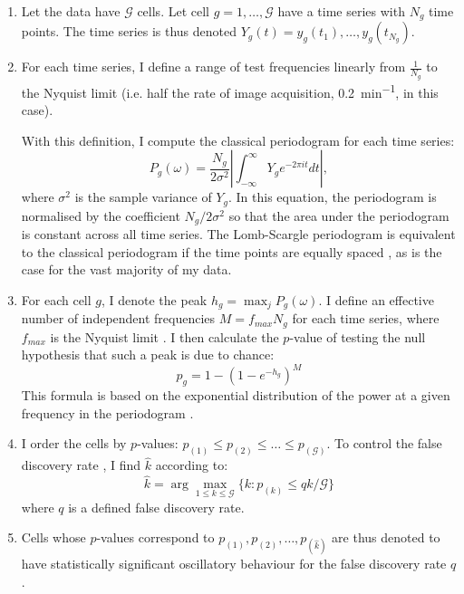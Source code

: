 \begin{enumerate}
\item Let the data have $\mathcal{G}$ cells.
Let cell $g = 1, \dots{}, \mathcal{G}$ have a time series with $N_{g}$ time points.
The time series is thus denoted $Y_{g}(t) = y_{g}(t_{1}), \dots{}, y_{g}(t_{N_{g}})$.
\item For each time series, I define a range of test frequencies linearly from $\frac{1}{N_{g}}$ to the Nyquist limit (i.e. half the rate of image acquisition, \SI{0.2}{\minute^{-1}}, in this case).

With this definition, I compute the classical periodogram for each time series:
  \begin{equation}
    P_{g}(\omega) = \frac{N_{g}}{2\sigma^{2}} \left|\int_{-\infty}^{\infty} Y_{g} e^{-2\pi it}dt \right|, %
    \label{eq:normalised-periodogram}
  \end{equation}
        where $\sigma^{2}$ is the sample variance of $Y_{g}$.
        In this equation, the periodogram is normalised by the coefficient $N_{g}/2\sigma^{2}$ so that the area under the periodogram is constant across all time series.
        The Lomb-Scargle periodogram is equivalent to the classical periodogram if the time points are equally spaced \parencite{lombLeastsquaresFrequencyAnalysis1976}, as is the case for the vast majority of my data.
\item For each cell $g$, I denote the peak $h_{g} = \max_{j}P_{g}(\omega)$.
I define an effective number of independent frequencies $M = f_{max}N_{g}$ for each time series, where $f_{max}$ is the Nyquist limit \parencite{vanderplasUnderstandingLombScarglePeriodogram2018}.
  I then calculate the $p$-value of testing the null hypothesis that such a peak is due to chance:
  \begin{equation}
    p_{g} = 1 - (1 - e^{-h_{g}})^M
    \label{eq:lsp-pval}
  \end{equation}
  This formula is based on the exponential distribution of the power at a given frequency in the periodogram \parencite{scargleStudiesAstronomicalTime1982}.
\item I order the cells by $p$-values: $p_{(1)} \leq p_{(2)} \leq \dots \leq p_{(\mathcal{G})}$.
  To control the false discovery rate \parencite{benjaminiControllingFalseDiscovery1995}, I find $\hat{k}$ according to:
  \begin{equation}
    \hat{k} = \arg\max_{1 \leq k \leq \mathcal{G}}\{k : p_{(k)} \leq qk/\mathcal{G}\}
    \label{eq:lsp-khat}
  \end{equation}
  where $q$ is a defined false discovery rate.
\item Cells whose $p$-values correspond to $p_{(1)}, p_{(2)}, \dots, p_{(\hat{k})}$ are thus denoted to have statistically significant oscillatory behaviour for the false discovery rate $q$.
\end{enumerate}

